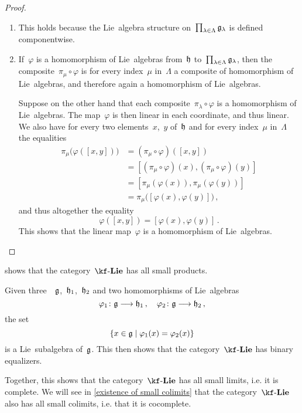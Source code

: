 \begin{proof}
	\leavevmode
	\begin{enumerate}
		\item
			This holds because the Lie~algebra structure on~$\prod_{\lambda \in \Lambda} \mathfrak{g}_{\lambda}$ is defined componentwise.
		\item
			If~$\varphi$ is a homomorphism of Lie~algebras from~$\mathfrak{h}$ to~$\prod_{\lambda \in \Lambda} \mathfrak{g}_\lambda$, then the composite~$\pi_\mu \circ \varphi$ is for every index~$\mu$ in~$\Lambda$ a composite of homomorphism of Lie~algebras, and therefore again a homomorphism of Lie~algebras.

			Suppose on the other hand that each composite~$\pi_\lambda \circ \varphi$ is a homomorphism of Lie~algebras.
			The map~$\varphi$ is then linear in each coordinate, and thus linear.
			We also have for every two elements~$x$,~$y$ of~$\mathfrak{h}$ and for every index~$\mu$ in~$\Lambda$ the equalities
			\begin{align*}
				\pi_\mu\bigl( \varphi( [ x, y ] ) \bigr)
				&=
				(\pi_\mu \circ \varphi)( [x, y] )
				\\
				&=
				[ (\pi_\mu \circ \varphi)(x), (\pi_\mu \circ \varphi)(y) ]
				\\
				&=
				[ \pi_\mu( \varphi(x) ), \pi_\mu( \varphi(y) ) ]
				\\
				&=
				\pi_\mu\bigl( [\varphi(x), \varphi(y)] \bigr) \,,
			\end{align*}
			and thus altogether the equality
			\[
				\varphi( [x,y] ) = [ \varphi(x), \varphi(y) ] \,.
			\]
			This shows that the linear map~$\varphi$ is a homomorphism of Lie~algebras.
		\qedhere
	\end{enumerate}
\end{proof}


\begin{remark}
	 shows that the category~$\cLie{\kf}$ has all small products.

	Given three~\liealgebras{$\kf$}~$\mathfrak{g}$,~$\mathfrak{h}_1$,~$\mathfrak{h}_2$ and two homomorphisms of Lie~algebras
	\[
		\varphi_1 \colon \glie \to \hlie_1 \,,
		\quad
		\varphi_2 \colon \glie \to \hlie_2 \,,
	\]
	the set
	\[
		\{
			x \in \glie
		\suchthat
			\varphi_1(x) = \varphi_2(x)
		\}
	\]
	is a Lie~subalgebra of~$\mathfrak{g}$.
	This then shows that the category~$\cLie{\kf}$ has binary equalizers.

	Together, this shows that the category~$\cLie{\kf}$ has all small limits, i.e. it is complete.
	We will see in \cref{existence of small colimits} that the category~$\cLie{\kf}$ also has all small colimits, i.e. that it is cocomplete.
\end{remark}



